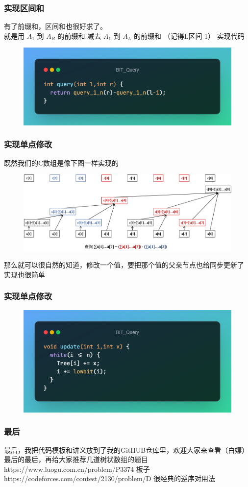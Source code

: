 \documentclass{beamer}
\begin{document}
	\begin{frame}
		\frametitle{实现区间和}
		有了前缀和，区间和也很好求了。 \\
		\pause
		就是用 $A_1$ 到 $A_R$ 的前缀和 减去 $A_1$ 到 $A_L$ 的前缀和 （记得L区间-1）
		\pause
		实现代码
		\begin{figure}
			\centering
			\includegraphics[width=0.7\linewidth]{pic/query}
			\caption{}
			\label{fig:query}
		\end{figure}
	\end{frame}
	
	\begin{frame}
		\frametitle{实现单点修改}
		既然我们的C数组是像下图一样实现的 \\
		\begin{figure}
			\centering
			\includegraphics[width=0.7\linewidth]{pic/BIT}
			\caption{}
			\label{fig:bit}
		\end{figure}
		那么就可以很自然的知道，修改一个值，要把那个值的父亲节点也给同步更新了 \\
		实现也很简单
		\pause
	\end{frame}
	
	\begin{frame}
		\frametitle{实现单点修改}
		\begin{figure}
			\centering
			\includegraphics[width=0.7\linewidth]{pic/update}
			\caption{}
			\label{fig:update}
		\end{figure}
	\end{frame}	
	
	\begin{frame}
		\frametitle{最后}
		最后，我把代码模板和讲义放到了我的GitHUB仓库里，欢迎大家来查看（白嫖） \\
		最后的最后，再给大家推荐几道树状数组的题目 \\
		
		https://www.luogu.com.cn/problem/P3374 板子\\
		https://codeforces.com/contest/2130/problem/D 很经典的逆序对用法
	\end{frame}
\end{document}

